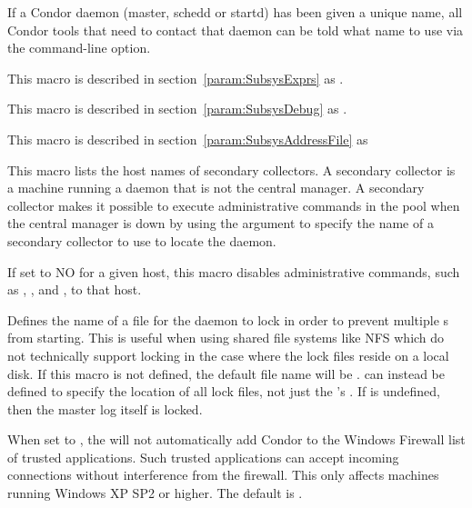 \begin{description}
  If a Condor daemon (master, schedd or startd) has been given a
  unique name, all Condor tools that need to contact that daemon can
  be told what name to use via the  command-line option.


\item[\Macro{MASTER\_ATTRS}] \label{param:MasterExprs} This macro is
  described in section~\ref{param:SubsysExprs} as
  .

\item[\Macro{MASTER\_DEBUG}] \label{param:MasterDebug} This macro
  is described in section~\ref{param:SubsysDebug} as
  .

\item[\Macro{MASTER\_ADDRESS\_FILE}] \label{param:MasterAddressFile}
  This macro is described in
  section~\ref{param:SubsysAddressFile} as

\item[\Macro{SECONDARY\_COLLECTOR\_LIST}]
  \label{param:SecondaryCollectorList} This macro lists the host names
  of secondary collectors.  A secondary collector is a machine
  running a  daemon that is not the central manager.
  A secondary collector makes it possible to execute administrative
  commands in the pool when the central manager is down by using the
   argument to specify the name of a secondary collector to
  use to locate the  daemon.

\item[\Macro{ALLOW\_ADMIN\_COMMANDS}]
  \label{param:AllowAdminCommands} If set to NO for a given host, this
  macro disables administrative commands, such as 
  , , and , to that host.

\item[\Macro{MASTER\_INSTANCE\_LOCK}] \label{param:MasterInstanceLock}
  Defines the name of a file for the  daemon
  to lock in order to prevent multiple s
  from starting.
  This is useful when using shared file systems like NFS which do
  not technically support locking in the case where the lock files
  reside on a local disk.
  If this macro is not defined, the default file name will be
  .
   can instead be defined to
  specify the location of all lock files, not just the 
  's .
  If  is undefined, then the master log itself is locked.

\item[\Macro{ADD\_WINDOWS\_FIREWALL\_EXCEPTION}]
  \label{param:AddWindowsFirewallException} When set to , the
   will not automatically add Condor to the Windows
  Firewall list of trusted applications. Such trusted applications can
  accept incoming connections without interference from the firewall. This
  only affects machines running Windows XP SP2 or higher. The default
  is .


\end{description}
